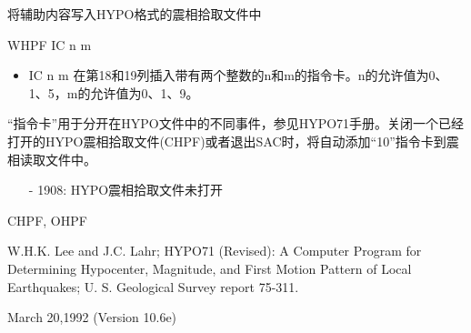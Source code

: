 \label{cmd:whpf}

将辅助内容写入HYPO格式的震相拾取文件中

WHPF IC n m

\begin{itemize}
\item IC n m  在第18和19列插入带有两个整数的n和m的指令卡。n的允许值为0、1、5，m的允许值为0、1、9。
\end{itemize}

``指令卡''用于分开在HYPO文件中的不同事件，参见HYPO71手册。关闭一个已经打开的HYPO震相拾取文件(CHPF)或者退出SAC时，将自动添加``10''指令卡到震相读取文件中。

\begin{itemize}
\item[-]1908: HYPO震相拾取文件未打开
\end{itemize}

CHPF, OHPF

W.H.K. Lee and J.C. Lahr; HYPO71 (Revised): A Computer Program for Determining 	Hypocenter, Magnitude, and First Motion Pattern of Local Earthquakes; U. S. Geological 	Survey report 75-311.

March 20,1992 (Version 10.6e)
